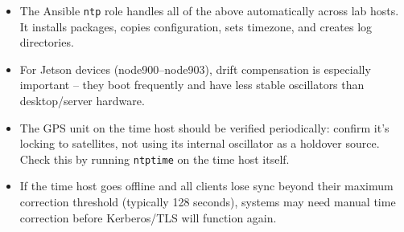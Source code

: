 \begin{itemize}
    \item The Ansible \texttt{ntp} role handles all of the above automatically across lab hosts. It installs packages, copies configuration, sets timezone, and creates log directories.
    
    \item For Jetson devices (node900--node903), drift compensation is especially important -- they boot frequently and have less stable oscillators than desktop/server hardware.
    
    \item The GPS unit on the time host should be verified periodically: confirm it's locking to satellites, not using its internal oscillator as a holdover source. Check this by running \texttt{ntptime} on the time host itself.
    
    \item If the time host goes offline and all clients lose sync beyond their maximum correction threshold (typically 128 seconds), systems may need manual time correction before Kerberos/TLS will function again.
\end{itemize}
